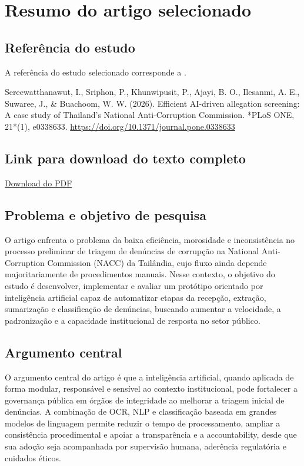 \documentclass[12pt,a4paper]{article}
\begin{document}
\section{Resumo do artigo selecionado}
\label{sec:orge7976b2}

\subsection{Referência do estudo}
\label{sec:org42478f0}

A referência do estudo selecionado corresponde a \autocite{i2026efficient}.

Sereewatthanawut, I., Sriphon, P., Khunwipusit, P., Ajayi, B. O., Ilesanmi, A. E., Suwaree, J., \& Buachoom, W. W. (2026). Efficient AI-driven allegation screening: A case study of Thailand’s National Anti-Corruption Commission. *PLoS ONE, 21*(1), e0338633. \url{https://doi.org/10.1371/journal.pone.0338633}

\subsection{Link para download do texto completo}
\label{sec:orgc11e64c}

\href{https://journals.plos.org/plosone/article/file?id=10.1371/journal.pone.0338633\&type=printable}{Download do PDF}

\subsection{Problema e objetivo de pesquisa}
\label{sec:orgc8733a8}

O artigo enfrenta o problema da baixa eficiência, morosidade e inconsistência no processo preliminar de triagem de denúncias de corrupção na National Anti-Corruption Commission (NACC) da Tailândia, cujo fluxo ainda depende majoritariamente de procedimentos manuais. Nesse contexto, o objetivo do estudo é desenvolver, implementar e avaliar um protótipo orientado por inteligência artificial capaz de automatizar etapas da recepção, extração, sumarização e classificação de denúncias, buscando aumentar a velocidade, a padronização e a capacidade institucional de resposta no setor público.

\subsection{Argumento central}
\label{sec:orgfdc24cb}

O argumento central do artigo é que a inteligência artificial, quando aplicada de forma modular, responsável e sensível ao contexto institucional, pode fortalecer a governança pública em órgãos de integridade ao melhorar a triagem inicial de denúncias. A combinação de OCR, NLP e classificação baseada em grandes modelos de linguagem permite reduzir o tempo de processamento, ampliar a consistência procedimental e apoiar a transparência e a accountability, desde que sua adoção seja acompanhada por supervisão humana, aderência regulatória e cuidados éticos.
\end{document}
